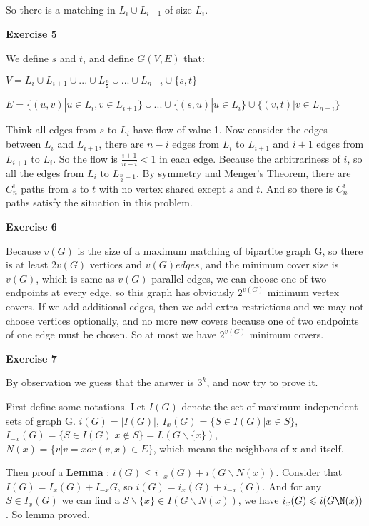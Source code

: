 \documentclass{article}
\begin{document}
So there is a matching in $L_{i} \cup L_{i+1}$ of size $L_{i}$.



\textbf{Exercise 5}

We define $s$ and $t$, and define $G(V,E)$ that:

$V = L_{i} \cup L_{i+1} \cup ... \cup L_{\frac{n}{2}} \cup ... \cup L_{n-i}  \cup \{s, t\}$

$E = \{  (u,v) | u \in L_{i}, v \in L_{i+1} \}\cup ... \cup \{(s,u) | u \in L_{i} \} \cup \{(v,t) | v \in L_{n-i} \}$

Think all edges from $s$ to $L_{i}$ have flow of value 1. Now consider the edges between $L_{i}$ and $L_{i+1}$, there are $n-i$ edges from $L_{i}$ to $L_{i+1}$ and $i+1$ edges from $L_{i+1}$ to $L_{i}$. So the flow is $\frac{i+1}{n-i} < 1$ in each edge. Because the arbitrariness of $i$, so all the edges from $L_{i}$ to $L_{\frac{n}{2} - 1}$. By symmetry and Menger’s Theorem, there are $C_{n}^{i}$ paths from $s$ to $t$ with no vertex shared except $s$ and $t$. And so there is $C_{n}^{i}$ paths satisfy the situation in this problem.




\textbf{Exercise 6}

Because $v(G)$ is the size of a maximum matching of bipartite graph G, so there is at least $2v(G)$ vertices and $v(G) edges$, and the minimum cover size is $v(G)$, which is same as $v(G)$ parallel edges, we can choose one of two endpoints at every edge, so this graph has obviously $2^{v(G)}$ minimum vertex covers. If we add additional edges, then we add extra restrictions and we may not choose vertices optionally, and no more new covers because one of two endpoints of one edge must be chosen. So at most we have $2^{v(G)}$ minimum covers.

\textbf{Exercise 7}

By observation we guess that the answer is $3^k$, and now try to prove it.

First define some notations. Let $I(G)$ denote the set of maximum independent sets of graph G.
 $i(G) = |I(G)|$, $I_{x}(G) = \{ S \in I(G) | x \in S \}$, $I_{-x}(G) = \{ S \in I(G) | x \notin S \} = L ( G\backslash \{ x \}  )$, $N(x) = \{ v | v = x or (v,x) \in E \}$, which means the neighbors of x and itself.
 
Then proof a \textbf{Lemma} : $i(G) \leqslant i_{-x}(G) + i(G\backslash N(x))$. Consider that $I(G) = I_{x}(G) + I_{-x}{G}$, so $i(G) = i_{x}(G) + i_{-x}(G)$. And for any $S \in I_{x}(G)$ we can find a $S \backslash \{ x \}   \in I(G\backslash N(x))$, we have $i_{x}(G) \leqslant i(G\N(x))$. So lemma proved.
\end{document}
